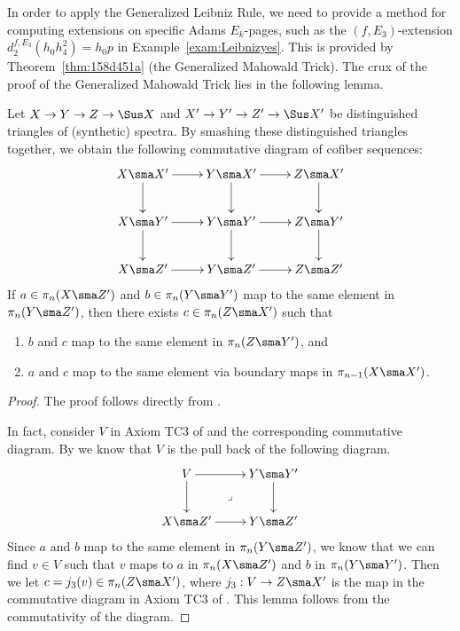\documentclass{amsart}
\numberwithin{equation}{section}
\begin{document}
In order to apply the Generalized Leibniz Rule, we need to provide a method for computing extensions on specific Adams $E_k$-pages, such as the $(f, E_3)$-extension $d_2^{f, E_3} (h_0h_4^2) = h_0 p$ in Example~\ref{exam:Leibnizyes}. This is provided by Theorem~\ref{thm:158d451a} (the Generalized Mahowald Trick). The crux of the proof of the Generalized Mahowald Trick lies in the following lemma.
\begin{lemma}\label{lem:452d218c}
    Let $X\to Y\to Z\to \Sus X$ and $X'\to Y'\to Z'\to \Sus X'$ be distinguished triangles of (synthetic) spectra. By smashing these distinguished triangles together, we obtain the following commutative diagram of cofiber sequences:
    $$\xymatrix{
    X\sma X' \ar[r] \ar[d] & Y\sma X' \ar[r] \ar[d] & Z\sma X' \ar[d]\\
    X\sma Y' \ar[d] \ar[r] & Y\sma Y' \ar[d] \ar[r] & Z\sma Y' \ar[d]\\
    X\sma Z' \ar[r] & Y\sma Z' \ar[r] & Z\sma Z'\\
    }$$
    If $a\in \pi_n(X\sma Z')$ and $b\in\pi_n(Y\sma Y')$ map to the same element in $\pi_n(Y\sma Z')$, then there exists $c\in \pi_n(Z\sma X')$ such that
    \begin{enumerate}
        \item $b$ and $c$ map to the same element in $\pi_n(Z\sma Y')$, and
        \item $a$ and $c$ map to the same element via boundary maps in $\pi_{n-1}(X\sma X')$.
    \end{enumerate}
\end{lemma}

\begin{proof}
The proof follows directly from \cite[Lemma 4.6]{May01}.

In fact, consider $V$ in Axiom TC3 of \cite[Section 4]{May01} and the corresponding commutative diagram. By \cite[Lemma 4.6]{May01} we know that $V$ is the pull back of the following diagram.
$$\xymatrix{
\ar@{}[dr]|\lrcorner V\ar[d]\ar[r]& Y\sma Y'\ar[d]\\
X\sma Z'\ar[r] & Y\sma Z'
}$$
Since $a$ and $b$ map to the same element in $\pi_n(Y\sma Z')$, we know that we can find $v\in V$ such that $v$ maps to $a$ in $\pi_n(X\sma Z')$ and $b$ in $\pi_n(Y\sma Y')$. Then we let $c=j_3(v)\in \pi_n(Z\sma X')$, where $j_3: V \rightarrow Z \sma X'$ is the map in the commutative diagram in Axiom TC3 of \cite[Section 4]{May01}. This lemma follows from the commutativity of the diagram.
\end{proof}
 
\end{document}
